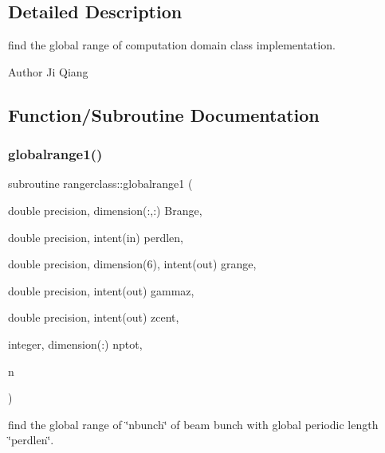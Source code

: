 \subsection{Detailed Description}
find the global range of computation domain class implementation. 

\begin{DoxyAuthor}{Author}
Ji Qiang 
\end{DoxyAuthor}


\subsection{Function/\+Subroutine Documentation}
\mbox{\label{namespacerangerclass_a888ad4da7ecf705d91306f3922f210af}} 
\subsubsection{\texorpdfstring{globalrange1()}{globalrange1()}}
{\footnotesize\ttfamily subroutine rangerclass\+::globalrange1 (\begin{DoxyParamCaption}\item[{double precision, dimension(\+:,\+:)}]{Brange,  }\item[{double precision, intent(in)}]{perdlen,  }\item[{double precision, dimension(6), intent(out)}]{grange,  }\item[{double precision, intent(out)}]{gammaz,  }\item[{double precision, intent(out)}]{zcent,  }\item[{integer, dimension(\+:)}]{nptot,  }\item[{}]{n }\end{DoxyParamCaption})}



find the global range of \char`\"{}nbunch\char`\"{} of beam bunch with global periodic length \char`\"{}perdlen\char`\"{}. 

\mbox{\label{namespacerangerclass_ad13f3def5e46e11250600f362cf040a6}} 

